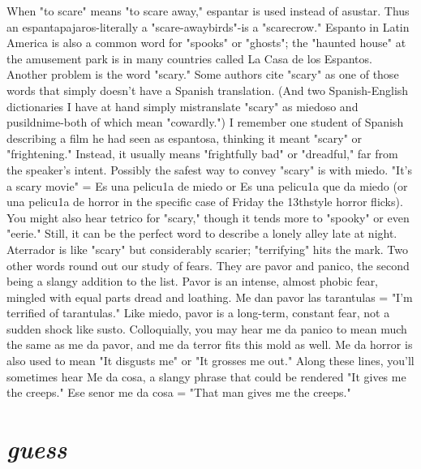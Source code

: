 {{{{When "to scare" means "to scare away," espantar is used instead of asustar. Thus an espantapajaros-literally a "scare-awaybirds"-is a "scarecrow." Espanto in Latin America is also a common
word for "spooks" or "ghosts"; the "haunted house" at the amusement
park is in many countries called La Casa de los Espantos.
Another problem is the word "scary." Some authors cite "scary"
as one of those words that simply doesn't have a Spanish translation.
(And two Spanish-English dictionaries I have at hand simply mistranslate "scary" as miedoso and pusildnime-both of which mean "cowardly.") I remember one student of Spanish describing a film he had
seen as espantosa, thinking it meant "scary" or "frightening." Instead,
it usually means "frightfully bad" or "dreadful," far from the speaker's
intent. Possibly the safest way to convey "scary" is with miedo. "It's a
scary movie" = Es una pelicu1a de miedo or Es una pelicu1a que da
miedo (or una pelicu1a de horror in the specific case of Friday the 13thstyle horror flicks). You might also hear tetrico for "scary," though
it tends more to "spooky" or even "eerie." Still, it can be the perfect
word to describe a lonely alley late at night. Aterrador is like "scary"
but considerably scarier; "terrifying" hits the mark.
Two other words round out our study of fears. They are pavor
and panico, the second being a slangy addition to the list. Pavor is an
intense, almost phobic fear, mingled with equal parts dread and loathing. Me dan pavor las tarantulas = "I'm terrified of tarantulas." Like
miedo, pavor is a long-term, constant fear, not a sudden shock like
susto. Colloquially, you may hear me da panico to mean much the
same as me da pavor, and me da terror fits this mold as well. Me da
horror is also used to mean "It disgusts me" or "It grosses me out."
Along these lines, you'll sometimes hear Me da cosa, a slangy phrase
that could be rendered "It gives me the creeps." Ese senor me da cosa
= "That man gives me the creeps."

\section{\emph{guess}}

}}}}
